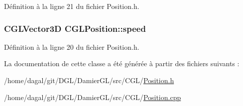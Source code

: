 Définition à la ligne 21 du fichier Position.\-h.

\hypertarget{class_c_g_l_position_ac5a3b64ac5c800b84a3b621e6e50c381}{
\subsubsection[{speed}]{\setlength{\rightskip}{0pt plus 5cm}C\-G\-L\-Vector3\-D C\-G\-L\-Position\-::speed\hspace{0.3cm}{\ttfamily [protected]}}}\label{class_c_g_l_position_ac5a3b64ac5c800b84a3b621e6e50c381}


Définition à la ligne 20 du fichier Position.\-h.



La documentation de cette classe a été générée à partir des fichiers suivants \-:\begin{DoxyCompactItemize}
\item 
/home/dagal/git/\-D\-G\-L/\-Damier\-G\-L/src/\-C\-G\-L/\hyperlink{_position_8h}{Position.\-h}\item 
/home/dagal/git/\-D\-G\-L/\-Damier\-G\-L/src/\-C\-G\-L/\hyperlink{_position_8cpp}{Position.\-cpp}\end{DoxyCompactItemize}
